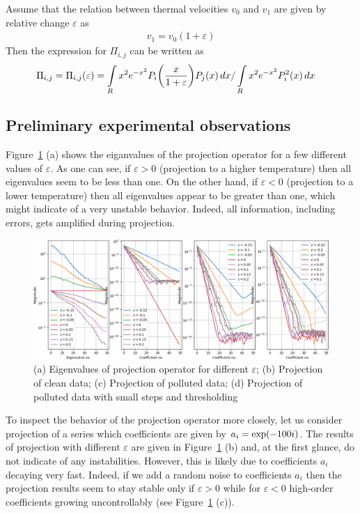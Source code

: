 \documentclass{article}[draft]
\begin{document}
Assume that the relation between thermal velocities $v_0$ and $v_1$ are given by relative change $\varepsilon$ as
\begin{align*}
v_1 = v_0 \left( 1 + \varepsilon \right)
\end{align*}
Then the expression for $\Pi_{i,j}$ can be written as
\begin{align*}
\Pi_{i,j} = \Pi_{i,j} \of{\varepsilon}
&= \myint_{R} x^2 e^{-x^2} P_i\of{\frac{x}{ 1 + \varepsilon }} P_j\of{x} \diff{x} / \myint_{R} x^2 e^{-x^2} P^2_i\of{x} \diff{x}
\end{align*}

\subsection{Preliminary experimental observations}

Figure~\ref{fig:projection} (a) shows the eiganvalues of the projection operator for a few different values of $\varepsilon$. As one can see, if $\varepsilon > 0$ (projection to a higher temperature) then all eigenvalues seem to be less than one. On the other hand, if $\varepsilon < 0$ (projection to a lower temperature) then all eigenvalues appear to be greater than one, which might indicate of a very unstable behavior. Indeed, all information, including errors, gets amplified during projection. 

\begin{figure}[H]
\label{fig:projection}
\centering
\includegraphics[width=\textwidth]{dat/projection_different_eps.png}
\caption{(a) Eigenvalues of projection operator for different $\varepsilon$; (b) Projection of clean data; (c) Projection of polluted data; (d) Projection of polluted data with small steps and thresholding}
\end{figure}

To inspect the behavior of the projection operator more closely, let us consider projection of a series which coefficients are given by $a_i = \exp\of{-100i}$. The results of projection with different $\varepsilon$ are given in Figure~\ref{fig:projection} (b) and, at the first glance, do not indicate of any instabilities. However, this is likely due to coefficients $a_i$ decaying very fast. Indeed, if we add a random noise to coefficients $a_i$ then the projection results seem to stay stable only if $\varepsilon > 0$ while for $\varepsilon < 0$ high-order coefficients growing uncontrollably (see Figure~\ref{fig:projection} (c)). 
\end{document}
